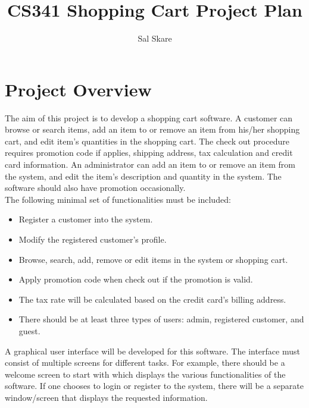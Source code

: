\documentclass[10pt,letter]{article}
\begin{document}

\title{CS341 Shopping Cart Project Plan}

\author{Sal Skare}

\maketitle 

\section*{Project Overview} The aim of this project is to develop a shopping cart software. A customer can browse or
search items, add an item to or remove an item from his/her shopping cart, and edit item’s
quantities in the shopping cart. The check out procedure requires promotion code if
applies, shipping address, tax calculation and credit card information. An administrator
can add an item to or remove an item from the system, and edit the item’s description and
quantity in the system. The software should also have promotion occasionally.
\\
The following minimal set of functionalities must be included:
\begin{itemize}
    \item Register a customer into the system.
    \item Modify the registered customer’s profile.
    \item Browse, search, add, remove or edit items in the system or shopping cart.
    \item Apply promotion code when check out if the promotion is valid.
    \item The tax rate will be calculated based on the credit card’s billing address.
    \item There should be at least three types of users: admin, registered customer, and guest.
\end{itemize}

\par A graphical user interface will be developed for this software. The interface must consist
of multiple screens for different tasks. For example, there should be a welcome screen to
start with which displays the various functionalities of the software. If one chooses to
login or register to the system, there will be a separate window/screen that displays the
requested information. 
\end{document}
